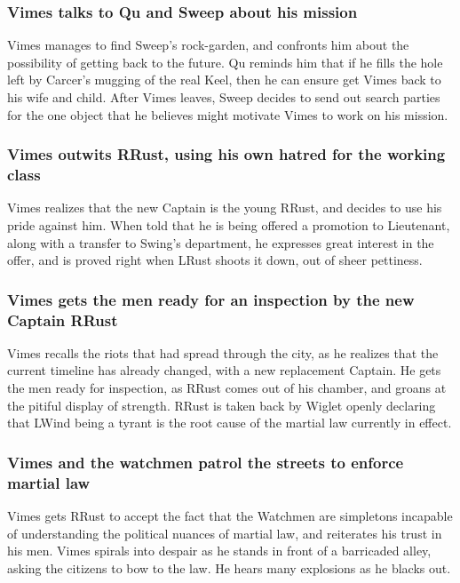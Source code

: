 \subsubsection{\Gls{Vimes} talks to \Gls{Qu} and \Gls{Sweep} about his mission}
\Gls{Vimes} manages to find \Gls{Sweep}'s rock-garden, and confronts him about the possibility of
getting back to the future. \Gls{Qu} reminds him that if he fills the hole left by \Gls{Carcer}'s
mugging of the real \Gls{Keel}, then he can ensure get \Gls{Vimes} back to his wife and child.
After \Gls{Vimes} leaves, \Gls{Sweep} decides to send out search parties for the one object that he
believes might motivate \Gls{Vimes} to work on his mission.

\subsubsection{\Gls{Vimes} outwits \Gls{RRust}, using his own hatred for the working class}
\Gls{Vimes} realizes that the new Captain is the young \Gls{RRust}, and decides to use his
pride against him. When told that he is being offered a promotion to Lieutenant, along with a
transfer to \Gls{Swing}'s department, he expresses great interest in the offer, and is proved right
when \Gls{LRust} shoots it down, out of sheer pettiness.

\subsubsection{\Gls{Vimes} gets the men ready for an inspection by the new Captain \Gls{RRust}}
\Gls{Vimes} recalls the riots that had spread through the city, as he realizes that the current
timeline has already changed, with a new replacement Captain. He gets the men ready for inspection,
as \Gls{RRust} comes out of his chamber, and groans at the pitiful display of strength. \Gls{RRust}
is taken back by \Gls{Wiglet} openly declaring that \Gls{LWind} being a tyrant is the root cause of
the martial law currently in effect.

\subsubsection{\Gls{Vimes} and the watchmen patrol the streets to enforce martial law}
\Gls{Vimes} gets \Gls{RRust} to accept the fact that the Watchmen are simpletons incapable of
understanding the political nuances of martial law, and reiterates his trust in his men. \Gls{Vimes}
spirals into despair as he stands in front of a barricaded alley, asking the citizens to bow to the
law. He hears many explosions as he blacks out.

